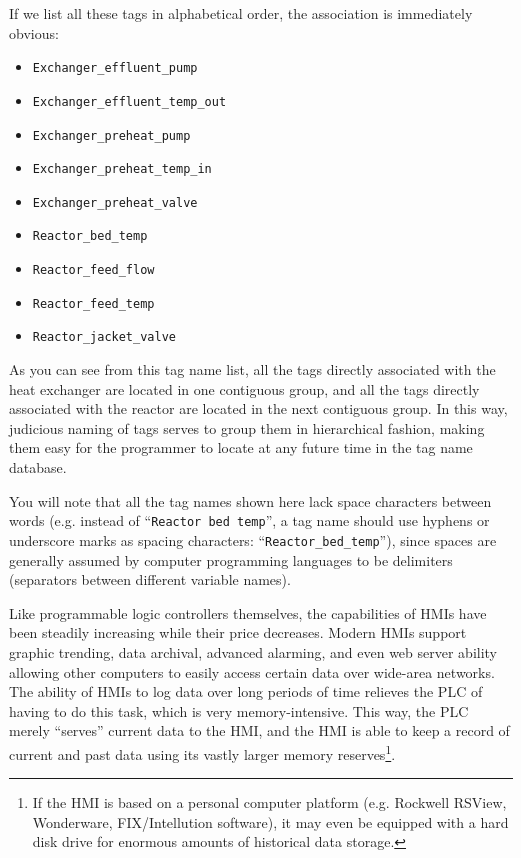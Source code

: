 \filbreak

If we list all these tags in alphabetical order, the association is immediately obvious:

\begin{itemize}
\item \texttt{Exchanger\_effluent\_pump}
\item \texttt{Exchanger\_effluent\_temp\_out}
\item \texttt{Exchanger\_preheat\_pump}
\item \texttt{Exchanger\_preheat\_temp\_in}
\item \texttt{Exchanger\_preheat\_valve}
\item \texttt{Reactor\_bed\_temp}
\item \texttt{Reactor\_feed\_flow}
\item \texttt{Reactor\_feed\_temp}
\item \texttt{Reactor\_jacket\_valve}
\end{itemize}

As you can see from this tag name list, all the tags directly associated with the heat exchanger are located in one contiguous group, and all the tags directly associated with the reactor are located in the next contiguous group.  In this way, judicious naming of tags serves to group them in hierarchical fashion, making them easy for the programmer to locate at any future time in the tag name database.

You will note that all the tag names shown here lack space characters between words (e.g. instead of ``\texttt{Reactor bed temp}'', a tag name should use hyphens or underscore marks as spacing characters: ``\texttt{Reactor\_bed\_temp}''), since spaces are generally assumed by computer programming languages to be delimiters (separators between different variable names).

\vskip 10pt

Like programmable logic controllers themselves, the capabilities of HMIs have been steadily increasing while their price decreases.  Modern HMIs support graphic trending, data archival, advanced alarming, and even web server ability allowing other computers to easily access certain data over wide-area networks.  The ability of HMIs to log data over long periods of time relieves the PLC of having to do this task, which is very memory-intensive.  This way, the PLC merely ``serves'' current data to the HMI, and the HMI is able to keep a record of current and past data using its vastly larger memory reserves\footnote{If the HMI is based on a personal computer platform (e.g. Rockwell RSView, Wonderware, FIX/Intellution software), it may even be equipped with a hard disk drive for enormous amounts of historical data storage.}.      
  
